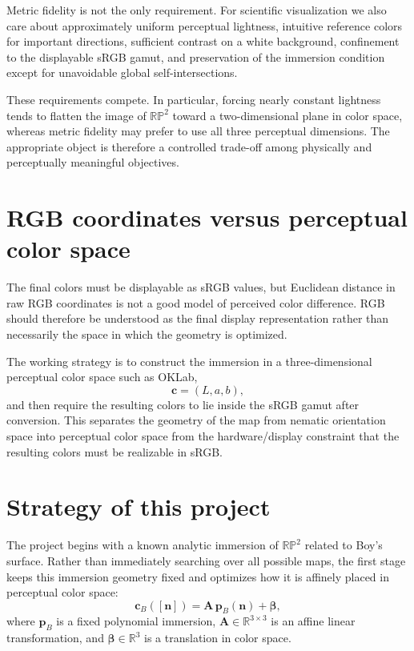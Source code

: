 \documentclass[11pt]{article}
\newcommand{\RP}{\mathbb{RP}}
\newcommand{\RR}{\mathbb{R}}
\newcommand{\vect}[1]{\mathbf{#1}}
\begin{document}
Metric fidelity is not the only requirement. For scientific visualization we also care about approximately uniform perceptual lightness, intuitive reference colors for important directions, sufficient contrast on a white background, confinement to the displayable sRGB gamut, and preservation of the immersion condition except for unavoidable global self-intersections.

These requirements compete. In particular, forcing nearly constant lightness tends to flatten the image of $\RP^2$ toward a two-dimensional plane in color space, whereas metric fidelity may prefer to use all three perceptual dimensions. The appropriate object is therefore a controlled trade-off among physically and perceptually meaningful objectives.

\section{RGB coordinates versus perceptual color space}

The final colors must be displayable as sRGB values, but Euclidean distance in raw RGB coordinates is not a good model of perceived color difference. RGB should therefore be understood as the final display representation rather than necessarily the space in which the geometry is optimized.

The working strategy is to construct the immersion in a three-dimensional perceptual color space such as OKLab,
\[
\vect c=(L,a,b),
\]
and then require the resulting colors to lie inside the sRGB gamut after conversion. This separates the geometry of the map from nematic orientation space into perceptual color space from the hardware/display constraint that the resulting colors must be realizable in sRGB.

\section{Strategy of this project}

The project begins with a known analytic immersion of $\RP^2$ related to Boy's surface. Rather than immediately searching over all possible maps, the first stage keeps this immersion geometry fixed and optimizes how it is affinely placed in perceptual color space:
\[
\vect c_B([\vect n])
=\vect A\,\vect p_B(\vect n)+\boldsymbol\beta,
\]
where $\vect p_B$ is a fixed polynomial immersion, $\vect A\in\RR^{3\times3}$ is an affine linear transformation, and $\boldsymbol\beta\in\RR^3$ is a translation in color space.
\end{document}
